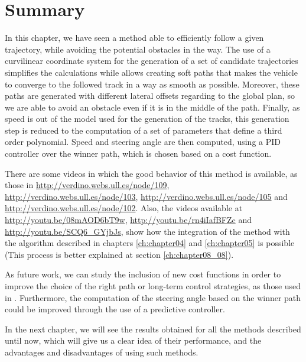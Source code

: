 % 

\section{Summary}\label{ch:chapter07_07}

In this chapter, we have seen a method able to efficiently follow a given trajectory, while avoiding the potential obstacles in the way. The use of a curvilinear coordinate system for the generation of a set of candidate trajectories simplifies the calculations while allows creating soft paths that makes the vehicle to converge to the followed track in a way as smooth as possible. Moreover, these paths are generated with different lateral offsets regarding to the global plan, so we are able to avoid an obstacle even if it is in the middle of the path. Finally, as speed is out of the model used for the generation of the tracks, this generation step is reduced to the computation of a set of parameters that define a third order polynomial. Speed and steering angle are then computed, using a \ac{PID} controller over the winner path, which is chosen based on a cost function.

There are some videos in which the good behavior of this method is available, as those in \url{http://verdino.webs.ull.es/node/109}, \url{http://verdino.webs.ull.es/node/103}, \url{http://verdino.webs.ull.es/node/105} and \url{http://verdino.webs.ull.es/node/102}. Also, the videos available at \url{http://youtu.be/08mAOD6bT9w}, \url{http://youtu.be/rn4iIafBFZc} and \url{http://youtu.be/SCQ6_GYjbJs}, show how the integration of the method with the algorithm described in chapters \ref{ch:chapter04} and \ref{ch:chapter05} is possible (This process is better explained at section \ref{ch:chapter08_08}).

As future work, we can study the inclusion of new cost functions in order to improve the choice of the right path or long-term control strategies, as those used in \cite{werling2010optimal}. Furthermore, the computation of the steering angle based on the winner path could be improved through the use of a predictive controller.

In the next chapter, we will see the results obtained for all the methods described until now, which will give us a clear idea of their performance, and the advantages and disadvantages of using such methods.


